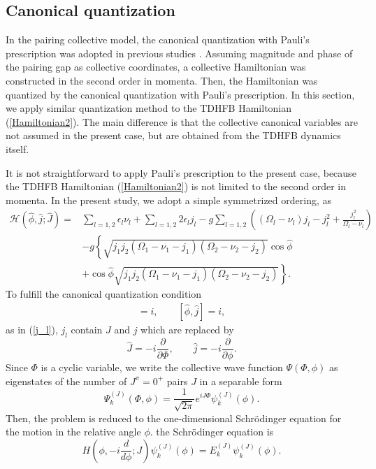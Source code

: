 \documentclass[11pt]{book} %
\begin{document}
\subsection{Canonical quantization}
\label{sec:canonical}
In the pairing collective model, the canonical quantization with Pauli's prescription
was adopted in previous studies \cite{BBPK70,GPBW85, ZPPRS99, P07}.
Assuming magnitude and phase of the pairing gap as collective coordinates,
a collective Hamiltonian was constructed in the second order in momenta.
Then, the Hamiltonian was quantized by the canonical quantization
with Pauli's prescription.
In this section, we apply similar quantization method to
the TDHFB Hamiltonian (\ref{Hamiltonian2}).
The main difference is that the collective canonical variables are
not assumed in the present case, but are obtained from the TDHFB dynamics
itself.\par
It is not straightforward to apply Pauli's prescription
to the present case, 
because the TDHFB Hamiltonian (\ref{Hamiltonian2})
is not limited to the second order in momenta.
In the present study, 
we adopt a simple symmetrized ordering, as
\begin{align}
	\mathcal{H}(\hat{\phi},\hat{j};\hat{J})
	=& \sum_{l=1,2} \epsilon_l\nu_l + \sum_{l=1,2} 2\epsilon_lj_l - g\sum_{l=1,2} \left( (\Omega_l-\nu_l) j_l - j_l^2 +\frac{j_l^2}{\Omega_l-\nu_l} \right) \nonumber \\
	&- g \left\{ \sqrt{j_1j_2(\Omega_{1}-\nu_{1}-j_{1})(\Omega_{2}-\nu_{2}-j_{2})}\cos{\hat{\phi}} \right. \nonumber \\
	&\left. + \cos{\hat{\phi}}\sqrt{j_1j_2(\Omega_{1}-\nu_{1}-j_{1})(\Omega_{2}-\nu_{2}-j_{2})} \right\} .
\label{canonical_quantized_H}
\end{align}
To fulfill the canonical quantization condition
\begin{align}
 [\hat{\Phi},\hat{J}]=i, \quad\quad [\hat{\phi},\hat{j}]=i ,
\end{align}
as in (\ref{j_l}), $j_l$ contain $J$ and $j$ which
are replaced by
\begin{equation}
	\hat{J} = -i\frac{\partial}{\partial\Phi},\quad\quad
	\hat{j} = -i\frac{\partial}{\partial\phi} .
\end{equation}
Since $\Phi$ is a cyclic variable, 
we write the collective wave function $\Psi(\Phi,\phi)$ as eigenstates
of the number of $J^{\pi}=0^+$ pairs $J$ in a separable form
\begin{equation}
  \Psi_k^{(J)}(\Phi,\phi) = 
	\frac{1}{\sqrt{2\pi}}e^{iJ\Phi}\psi_k^{(J)}(\phi) .
\end{equation}
Then, the problem is reduced to the one-dimensional Schr\"{o}dinger
equation for the motion in the relative angle $\phi$.
the Schr\"{o}dinger equation is
\begin{equation}
	H\left( \phi,-i\frac{d}{d\phi};J \right)
	\psi_k^{(J)}(\phi) = E_k^{(J)}\psi_k^{(J)}(\phi) .
	\label{Schroedinger_eq}
\end{equation}
\end{document}
